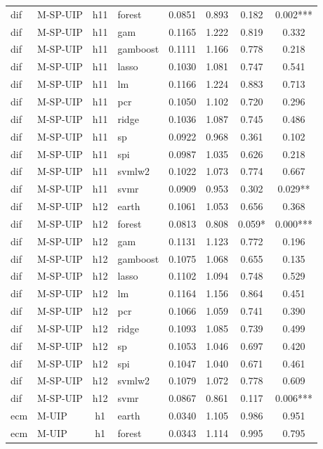 \begin{ThreePartTable}
\begin{longtable}[t]{llclcccc}
dif & M-SP-UIP & h11 & forest & 0.0851 & 0.893 & 0.182 & 0.002***\\
dif & M-SP-UIP & h11 & gam & 0.1165 & 1.222 & 0.819 & 0.332\\
dif & M-SP-UIP & h11 & gamboost & 0.1111 & 1.166 & 0.778 & 0.218\\
dif & M-SP-UIP & h11 & lasso & 0.1030 & 1.081 & 0.747 & 0.541\\
dif & M-SP-UIP & h11 & lm & 0.1166 & 1.224 & 0.883 & 0.713\\
dif & M-SP-UIP & h11 & pcr & 0.1050 & 1.102 & 0.720 & 0.296\\
dif & M-SP-UIP & h11 & ridge & 0.1036 & 1.087 & 0.745 & 0.486\\
dif & M-SP-UIP & h11 & sp & 0.0922 & 0.968 & 0.361 & 0.102\\
dif & M-SP-UIP & h11 & spi & 0.0987 & 1.035 & 0.626 & 0.218\\
dif & M-SP-UIP & h11 & svmlw2 & 0.1022 & 1.073 & 0.774 & 0.667\\
dif & M-SP-UIP & h11 & svmr & 0.0909 & 0.953 & 0.302 & 0.029**\\
\addlinespace
dif & M-SP-UIP & h12 & earth & 0.1061 & 1.053 & 0.656 & 0.368\\
dif & M-SP-UIP & h12 & forest & 0.0813 & 0.808 & 0.059* & 0.000***\\
dif & M-SP-UIP & h12 & gam & 0.1131 & 1.123 & 0.772 & 0.196\\
dif & M-SP-UIP & h12 & gamboost & 0.1075 & 1.068 & 0.655 & 0.135\\
dif & M-SP-UIP & h12 & lasso & 0.1102 & 1.094 & 0.748 & 0.529\\
dif & M-SP-UIP & h12 & lm & 0.1164 & 1.156 & 0.864 & 0.451\\
dif & M-SP-UIP & h12 & pcr & 0.1066 & 1.059 & 0.741 & 0.390\\
dif & M-SP-UIP & h12 & ridge & 0.1093 & 1.085 & 0.739 & 0.499\\
dif & M-SP-UIP & h12 & sp & 0.1053 & 1.046 & 0.697 & 0.420\\
dif & M-SP-UIP & h12 & spi & 0.1047 & 1.040 & 0.671 & 0.461\\
dif & M-SP-UIP & h12 & svmlw2 & 0.1079 & 1.072 & 0.778 & 0.609\\
dif & M-SP-UIP & h12 & svmr & 0.0867 & 0.861 & 0.117 & 0.006***\\
\addlinespace
ecm & M-UIP & h1 & earth & 0.0340 & 1.105 & 0.986 & 0.951\\
ecm & M-UIP & h1 & forest & 0.0343 & 1.114 & 0.995 & 0.795\\

\end{longtable}
\end{ThreePartTable}
